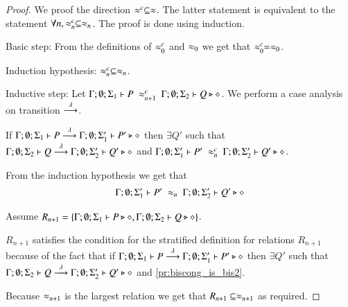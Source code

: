 \begin{proof}
	We proof the direction $\approx^{c} \subseteq \approx$.
	The latter statement is equivalent to the statement $\forall n, \approx^{c}_n \subseteq \approx_n$.
	The proof is done using induction.

	Basic step: From the definitions of $\approx^{c}_0$ and $\approx_0$ we get that $\approx^{c}_0 = \approx_0$.

	Induction hypothesis: $\approx^{c}_n \subseteq \approx_n$.

	Inductive step: Let $\Gamma; \emptyset; \Sigma_1 \vdash P\ \approx^{c}_{n+1}\ \Gamma; \emptyset; \Sigma_2 \vdash Q \triangleright \diamond$.
	We perform a case analysis on transition $\stackrel{\lambda}{\longrightarrow}$.


	If $\Gamma; \emptyset; \Sigma_1 \vdash P \stackrel{\lambda}{\longrightarrow} \Gamma; \emptyset; \Sigma_1' \vdash P' \triangleright \diamond$ then
	$\exists Q'$ such that
	$\Gamma; \emptyset; \Sigma_2 \vdash Q \stackrel{\lambda}{\longrightarrow} \Gamma; \emptyset; \Sigma_2' \vdash Q' \triangleright \diamond$
	and
	$\Gamma; \emptyset; \Sigma_1' \vdash P'\ \approx^{c}_n\ \Gamma; \emptyset; \Sigma_2' \vdash Q' \triangleright \diamond$.

	From the induction hypothesis we get that
	\begin{eqnarray}
		\Gamma; \emptyset; \Sigma_1' \vdash P'\ \approx_n\ \Gamma; \emptyset; \Sigma_2' \vdash Q' \triangleright \diamond \label{pr:biscong_is_bis2}
	\end{eqnarray}

	Assume $R_{n+1} = \{\Gamma; \emptyset; \Sigma_1 \vdash P \triangleright \diamond, \Gamma; \emptyset; \Sigma_2 \vdash Q \triangleright \diamond\}$.

	$R_{n+1}$ satisfies the condition for the stratified definition for relations $R_{n+1}$ because of the fact that
	if $\Gamma; \emptyset; \Sigma_1 \vdash P \stackrel{\lambda}{\longrightarrow} \Gamma; \emptyset; \Sigma_1' \vdash P' \triangleright \diamond$ then
	$\exists Q'$ such that
	$\Gamma; \emptyset; \Sigma_2 \vdash Q \stackrel{\lambda}{\longrightarrow} \Gamma; \emptyset; \Sigma_2' \vdash Q' \triangleright \diamond$
	and \ref{pr:biscong_is_bis2}.

	Because $\approx_{n+1}$ is the largest relation we get that $R_{n+1} \subseteq \approx_{n+1}$ as required.



\end{proof}

